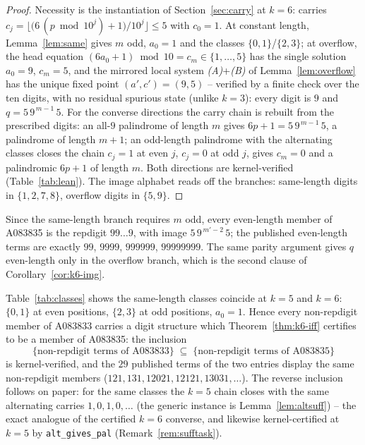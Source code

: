 \begin{proof}
Necessity is the instantiation of
Section~\ref{sec:carry} at $k = 6$: carries
$c_j = \bigl\lfloor\bigl(6\,(p \bmod 10^j)+1\bigr)
/10^j\bigr\rfloor \le 5$ with $c_0 = 1$. At constant
length, Lemma~\ref{lem:same} gives $m$ odd, $a_0 = 1$
and the classes $\{0,1\}$/$\{2,3\}$; at overflow, the
head equation $(6a_0+1) \bmod 10 = c_m \in \{1,\dots,5\}$
has the single solution $a_0 = 9$, $c_m = 5$, and the
mirrored local system \emph{(A)}+\emph{(B)} of
Lemma~\ref{lem:overflow} has the unique fixed point
$(a',c') = (9,5)$ -- verified by a finite check over the
ten digits, with no residual spurious state (unlike
$k = 3$): every digit is $9$ and
$q = 5\,9^{\,m-1}\,5$. For the converse directions the
carry chain is rebuilt from the prescribed digits: an
all-$9$ palindrome of length $m$ gives
$6p+1 = 5\,9^{\,m-1}\,5$, a palindrome of length $m+1$;
an odd-length palindrome with the alternating classes
closes the chain $c_j = 1$ at even $j$, $c_j = 0$ at odd
$j$, gives $c_m = 0$ and a palindromic $6p+1$ of length
$m$. Both directions are kernel-verified
(Table~\ref{tab:lean}). The image alphabet reads off
the branches: same-length digits in $\{1,2,7,8\}$,
overflow digits in $\{5,9\}$.
\end{proof}

\begin{remark}
\label{rem:k6-even}
Since the same-length branch requires $m$ odd, every
even-length member of A083835 is the repdigit
$99\ldots9$, with image $5\,9^{\,m'-2}\,5$; the
published even-length terms are exactly $99$, $9999$,
$999999$, $99999999$. The same parity argument gives
$q$ even-length only in the overflow branch, which is
the second clause of Corollary~\ref{cor:k6-img}.
\end{remark}

\begin{remark}[the shared alternating classes at
$k = 5$ and $k = 6$]
\label{rem:converse}
Table~\ref{tab:classes} shows the same-length classes
coincide at $k = 5$ and $k = 6$: $\{0,1\}$ at even
positions, $\{2,3\}$ at odd positions, $a_0 = 1$. Hence
every non-repdigit member of A083833 carries a digit
structure which Theorem~\ref{thm:k6-iff} certifies to
be a member of A083835: the inclusion
\[
\{\text{non-repdigit terms of A083833}\}
\;\subseteq\;
\{\text{non-repdigit terms of A083835}\}
\]
is kernel-verified, and the $29$ published terms of the
two entries display the same non-repdigit members
($121, 131, 12021, 12121, 13031, \ldots$). The reverse
inclusion follows on paper: for the same classes the
$k = 5$ chain closes with the same alternating carries
$1,0,1,0,\ldots$ (the generic instance is
Lemma~\ref{lem:altsuff}) -- the exact analogue of the certified
$k = 6$ converse, and likewise kernel-certified at
$k = 5$ by \texttt{alt\_gives\_pal}
(Remark~\ref{rem:sufftask}).
\end{remark}
